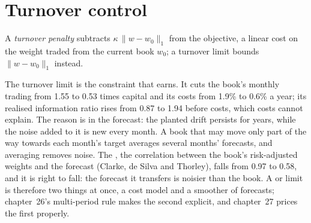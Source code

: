 \section{Turnover control}

\begin{definition}\label{def:rs:portfolio-construction-i:turnover}
A \emph{turnover penalty} subtracts $\kappa\,\lVert w - w_0\rVert_1$ from the objective, a linear cost on the weight traded from the
current book $w_0$; a turnover limit bounds $\lVert w - w_0\rVert_1$ instead.
\end{definition}

The turnover limit is the constraint that earns. It cuts the book's monthly trading from 1.55 to 0.53 times capital and its costs from 1.9\% to 0.6\% a year; its
realised information ratio rises from 0.87 to 1.94 before costs, which costs cannot explain. The reason is in the forecast: the planted drift persists for years,
while the noise added to it is new every month. A book that may move only part of the way towards each month's target averages several months' forecasts, and
averaging removes noise. The , the correlation between the book's risk-adjusted weights and the forecast (Clarke, de Silva and Thorley), falls
from 0.97 to 0.58, and it is right to fall: the forecast it transfers is noisier than the book. A  or limit is therefore two things at once, a cost
model and a smoother of forecasts; chapter~26's multi-period rule makes the second explicit, and chapter~27 prices the first properly.

\begin{omfigure}

\label{fig:rs:portfolio-construction-i:cum}
\end{omfigure}

